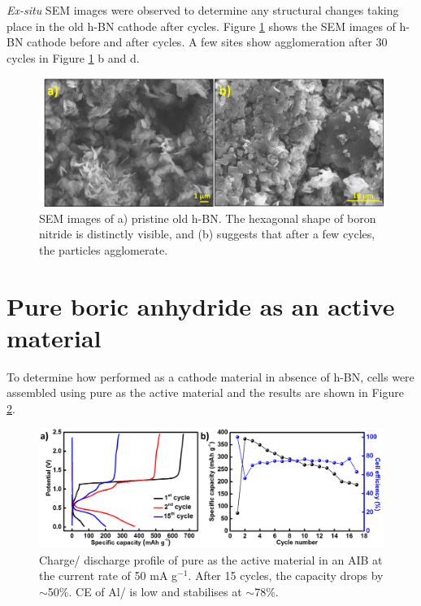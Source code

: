 \textit{Ex-situ} SEM images were observed to determine any structural changes taking place in the old h-BN cathode after cycles. Figure \ref{Figures/BOhBN:hBNSEM} shows the SEM images of h-BN cathode before and after cycles. A few sites show agglomeration after 30 cycles in Figure \ref{Figures/BOhBN:hBNSEM} b and d.

\begin{figure}[tbh!]
\centering
\includegraphics[width=\textwidth]{Figures/BOhBN/hBNSEM}
\caption{SEM images of a) pristine old h-BN. The hexagonal shape of boron nitride is distinctly visible, and (b) suggests that after a few cycles, the particles agglomerate.}
\label{Figures/BOhBN:hBNSEM}
\end{figure}

\section*{Pure boric anhydride  as an active material}
To determine how  performed as a cathode material in absence of h-BN, cells were assembled using pure  as the active material and the results are shown in Figure \ref{Figures/BOhBN:BOCDC}. 

\begin{figure}[tbh!]
\centering
\includegraphics[width=\textwidth]{Figures/BOhBN/BOCDC}
\caption{Charge/ discharge profile of pure  as the active material in an AIB at the current rate of 50 mA g$^{-1}$. After 15 cycles, the capacity drops by $\sim$50\%. CE of Al/ is low and  stabilises at $\sim$78\%.}
\label{Figures/BOhBN:BOCDC}
\end{figure}

